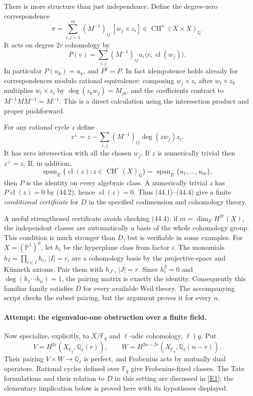 \documentclass[11pt,a4paper]{article}
\newcommand{\Q}{\mathbb{Q}}
\newcommand{\F}{\mathbb{F}}
\newcommand{\PP}{\mathbb P}
\newcommand{\eref}[2]{\hyperlink{extra:#1:#2}{[E#2]}}
\numberwithin{equation}{section}
\begin{document}
There is more structure than just independence. Define the degree-zero
correspondence
\[
 \pi=\sum_{i,j=1}^m(M^{-1})_{ij}\,[w_j\times z_i]
          \in\operatorname{CH}^{n}(X\times X)_{\Q}. \tag{44.1}
\]
It acts on degree $2r$ cohomology by
\[
 P(v)=\sum_{i,j}(M^{-1})_{ij}u_i\langle v,\operatorname{cl}(w_j)\rangle.
 \tag{44.2}
\]
In particular $P(u_k)=u_k$, and $P^2=P$. In fact idempotence holds
already for correspondences modulo rational equivalence: composing
$w_j\times z_i$ after $w_l\times z_k$ multiplies $w_l\times z_i$
by $\deg(z_kw_j)=M_{jk}$, and the coefficients contract to
$M^{-1}MM^{-1}=M^{-1}$. This is a direct calculation using the
intersection product and proper pushforward.

For any rational cycle $z$ define
\[
 z^\perp=z-\sum_{i,j}(M^{-1})_{ij}\deg(zw_j)z_i.
 \tag{44.3}
\]
It has zero intersection with all the chosen $w_j$. If $z$ is numerically
trivial then $z^\perp=z$. If, in addition,
\[
 \operatorname{span}_E\{\operatorname{cl}(z):z\in
          \operatorname{CH}^r(X)_{\Q}\}
       =\operatorname{span}_E\{u_1,\ldots,u_m\}, \tag{44.4}
\]
then $P$ is the identity on every algebraic class. A numerically trivial
$z$ has $P\operatorname{cl}(z)=0$ by (44.2), hence
$\operatorname{cl}(z)=0$. Thus (44.1)--(44.4) give a finite
\emph{conditional certificate} for $D$ in the specified codimension
and cohomology theory.

A useful strengthened certificate avoids checking (44.4): if
$m=\dim_E H^{2r}(X)$, the independent classes are automatically a basis
of the whole cohomology group. This condition is much stronger than $D$,
but is verifiable in some examples. For $X=(\PP^1)^n$, let $h_i$ be the
hyperplane class from factor $i$. The monomials $h_I=\prod_{i\in I}h_i$,
$|I|=r$, are a cohomology basis by the projective-space and K\"unneth
axioms. Pair them with $h_{J^c}$, $|J|=r$. Since $h_i^2=0$ and
$\deg(h_1\cdots h_n)=1$, the pairing matrix is exactly the identity.
Consequently this familiar family satisfies $D$ for every available
Weil theory. The accompanying script checks the subset pairing, but the
argument proves it for every $n$.

\paragraph{Attempt: the eigenvalue-one obstruction over a finite field.}
Now specialize, explicitly, to $X/\F_q$ and $\ell$-adic cohomology,
$\ell\nmid q$. Put
\[
 V=H^{2r}(X_{\overline{\F}_q},\Q_\ell(r)),\qquad
 W=H^{2n-2r}(X_{\overline{\F}_q},\Q_\ell(n-r)).
\]
Their pairing $V\times W\to\Q_\ell$ is perfect, and Frobenius acts by
mutually dual operators. Rational cycles defined over $\F_q$ give
Frobenius-fixed classes. The Tate formulations and their relation to
$D$ in this setting are discussed in \eref{30006693}{1}; the elementary
implication below is proved here with its hypotheses displayed.
\end{document}
